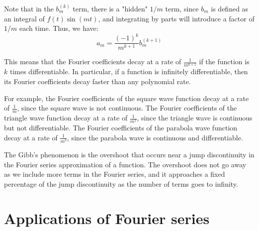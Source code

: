 Note that in the $b_m^{(k)}$ term, there is a "hidden" $1/m$ term, since $b_m$ is defined as an integral of $f(t) \sin(mt)$, and integrating by parts will introduce a factor of $1/m$ each time. Thus, we have:
\begin{equation*}
a_m = \frac{(-1)^k}{m^{k+1}} b_m^{(k+1)}
\end{equation*}

This means that the Fourier coefficients decay at a rate of $\frac{1}{m^{k+1}}$ if the function is $k$ times differentiable. In particular, if a function is infinitely differentiable, then its Fourier coefficients decay faster than any polynomial rate.

For example, the Fourier coefficients of the square wave function decay at a rate of $\frac{1}{m}$, since the square wave is not continuous. The Fourier coefficients of the triangle wave function decay at a rate of $\frac{1}{m^2}$, since the triangle wave is continuous but not differentiable. The Fourier coefficients of the parabola wave function decay at a rate of $\frac{1}{m^3}$, since the parabola wave is continuous and differentiable.


The Gibb's phenomenon is the overshoot that occurs near a jump discontinuity in the Fourier series approximation of a function. The overshoot does not go away as we include more terms in the Fourier series, and it approaches a fixed percentage of the jump discontinuity as the number of terms goes to infinity.

\section{Applications of Fourier series}

